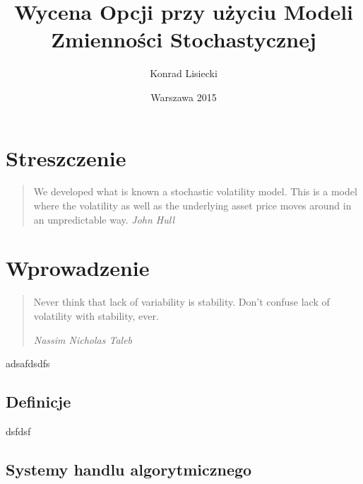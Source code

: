 \documentclass{pracamgr}
\author{Konrad Lisiecki}
\title{Wycena Opcji przy użyciu Modeli Zmienności Stochastycznej}
\date{Warszawa 2015}
\begin{document}
\maketitle
\nocite{book-full} 

\chapter*{Streszczenie} 

\begin{quote}
We developed what is known a stochastic volatility model. This is a model where the volatility as well as the underlying asset price moves around in an unpredictable way.
\raggedleft\slshape John Hull 
\end{quote}



\tableofcontents
 

 


\chapter{Wprowadzenie}\label{r:pojecia}
\begin{quote}

Never think that lack of variability is stability. Don't confuse lack of volatility with stability, ever.
 
\raggedleft\slshape Nassim Nicholas Taleb 
\end{quote}
 


adsafdsdfs
 
\section{Definicje}
dsfdsf

\section{Systemy handlu algorytmicznego}
\end{document}
